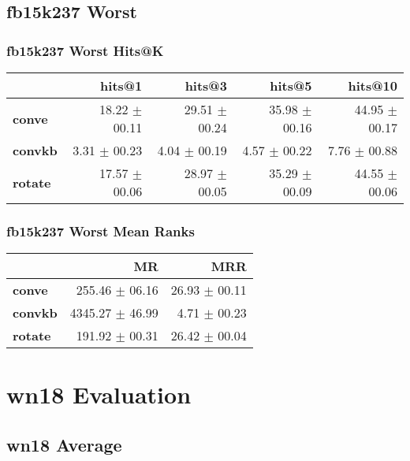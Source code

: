 \documentclass{article}
\begin{document}
\subsection{fb15k237 Worst}
\subsubsection{fb15k237 Worst Hits@K}
    \begin{center}
    \begin{tabular}{lrrrr}
\toprule
{} &         hits@1 &         hits@3 &         hits@5 &        hits@10 \\
\midrule
\textbf{conve } &  18.22 $\pm$ 00.11 &  29.51 $\pm$ 00.24 &  35.98 $\pm$ 00.16 &  44.95 $\pm$ 00.17 \\
\textbf{convkb} &   3.31 $\pm$ 00.23 &   4.04 $\pm$ 00.19 &   4.57 $\pm$ 00.22 &   7.76 $\pm$ 00.88 \\
\textbf{rotate} &  17.57 $\pm$ 00.06 &  28.97 $\pm$ 00.05 &  35.29 $\pm$ 00.09 &  44.55 $\pm$ 00.06 \\
\bottomrule
\end{tabular}

    \end{center}
\subsubsection{fb15k237 Worst Mean Ranks}
    \begin{center}
    \begin{tabular}{lrr}
\toprule
{} &               MR &            MRR \\
\midrule
\textbf{conve } &   255.46 $\pm$ 06.16 &  26.93 $\pm$ 00.11 \\
\textbf{convkb} &  4345.27 $\pm$ 46.99 &   4.71 $\pm$ 00.23 \\
\textbf{rotate} &   191.92 $\pm$ 00.31 &  26.42 $\pm$ 00.04 \\
\bottomrule
\end{tabular}

    \end{center}

\section{wn18 Evaluation}
\subsection{wn18 Average}
\end{document}
